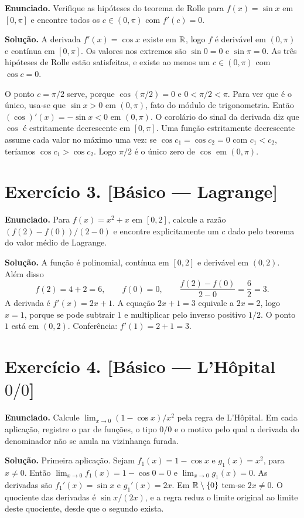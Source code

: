 \documentclass[11pt,a4paper]{article}
\begin{document}
\textbf{Enunciado.} Verifique as hipóteses do teorema de Rolle para $f(x)=\sin x$ em $[0,\pi]$ e encontre todos os $c\in(0,\pi)$ com $f'(c)=0$.

\textbf{Solução.}
A derivada $f'(x)=\cos x$ existe em $\mathbb{R}$, logo $f$ é derivável em $(0,\pi)$ e contínua em $[0,\pi]$. Os valores nos extremos são $\sin 0=0$ e $\sin\pi=0$. As três hipóteses de Rolle estão satisfeitas, e existe ao menos um $c\in(0,\pi)$ com $\cos c=0$.

O ponto $c=\pi/2$ serve, porque $\cos(\pi/2)=0$ e $0<\pi/2<\pi$. Para ver que é o único, usa-se que $\sin x>0$ em $(0,\pi)$, fato do módulo de trigonometria. Então $(\cos)'(x)=-\sin x<0$ em $(0,\pi)$. O corolário do sinal da derivada diz que $\cos$ é estritamente decrescente em $[0,\pi]$. Uma função estritamente decrescente assume cada valor no máximo uma vez: se $\cos c_1=\cos c_2=0$ com $c_1<c_2$, teríamos $\cos c_1>\cos c_2$. Logo $\pi/2$ é o único zero de $\cos$ em $(0,\pi)$.

\section*{Exercício 3. [Básico --- Lagrange]}

\textbf{Enunciado.} Para $f(x)=x^2+x$ em $[0,2]$, calcule a razão $(f(2)-f(0))/(2-0)$ e encontre explicitamente um $c$ dado pelo teorema do valor médio de Lagrange.

\textbf{Solução.}
A função é polinomial, contínua em $[0,2]$ e derivável em $(0,2)$. Além disso
\[
f(2)=4+2=6,\qquad f(0)=0,\qquad \frac{f(2)-f(0)}{2-0}=\frac{6}{2}=3.
\]
A derivada é $f'(x)=2x+1$. A equação $2x+1=3$ equivale a $2x=2$, logo $x=1$, porque se pode subtrair $1$ e multiplicar pelo inverso positivo $1/2$. O ponto $1$ está em $(0,2)$. Conferência: $f'(1)=2+1=3$.

\section*{Exercício 4. [Básico --- L'Hôpital $0/0$]}

\textbf{Enunciado.} Calcule $\lim_{x\to 0}(1-\cos x)/x^2$ pela regra de L'Hôpital. Em cada aplicação, registre o par de funções, o tipo $0/0$ e o motivo pelo qual a derivada do denominador não se anula na vizinhança furada.

\textbf{Solução.}
Primeira aplicação. Sejam $f_1(x)=1-\cos x$ e $g_1(x)=x^2$, para $x\neq 0$. Então $\lim_{x\to 0}f_1(x)=1-\cos 0=0$ e $\lim_{x\to 0}g_1(x)=0$. As derivadas são $f_1'(x)=\sin x$ e $g_1'(x)=2x$. Em $\mathbb{R}\setminus\{0\}$ tem-se $2x\neq 0$. O quociente das derivadas é $\sin x/(2x)$, e a regra reduz o limite original ao limite deste quociente, desde que o segundo exista.
\end{document}
